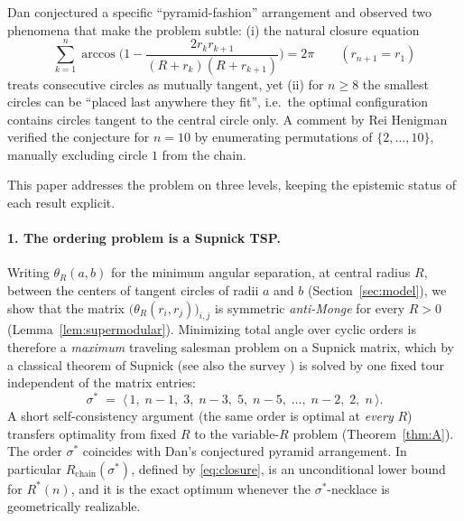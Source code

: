 \documentclass[11pt]{article}
\theoremstyle{definition}
\theoremstyle{remark}
\begin{document}
Dan conjectured a specific ``pyramid-fashion'' arrangement and observed two phenomena that make the problem subtle: (i) the natural closure equation
\begin{equation}\label{eq:closure}
\sum_{k=1}^{n}\arccos\!\Big(1-\frac{2r_kr_{k+1}}{(R+r_k)(R+r_{k+1})}\Big)=2\pi
\qquad (r_{n+1}=r_1)
\end{equation}
treats consecutive circles as mutually tangent, yet (ii) for $n\ge 8$ the smallest circles can be ``placed last anywhere they fit'', i.e.\ the optimal configuration contains circles tangent to the central circle only. A comment by Rei Henigman \cite{mse} verified the conjecture for $n=10$ by enumerating permutations of $\{2,\dots,10\}$, manually excluding circle $1$ from the chain.

This paper addresses the problem on three levels, keeping the epistemic status of each result explicit.

\paragraph{1. The ordering problem is a Supnick TSP.}
Writing $\theta_R(a,b)$ for the minimum angular separation, at central radius $R$, between the centers of tangent circles of radii $a$ and $b$ (Section~\ref{sec:model}), we show that the matrix $\big(\theta_R(r_i,r_j)\big)_{i,j}$ is symmetric \emph{anti-Monge} for every $R>0$ (Lemma~\ref{lem:supermodular}). Minimizing total angle over cyclic orders is therefore a \emph{maximum} traveling salesman problem on a Supnick matrix, which by a classical theorem of Supnick \cite{supnick} (see also the survey \cite{bdvvw}) is solved by one fixed tour independent of the matrix entries:
\[
\sigma^\ast \;=\; \langle\, 1,\; n-1,\; 3,\; n-3,\; 5,\; n-5,\;\dots,\; n-2,\; 2,\; n \,\rangle .
\]
A short self-consistency argument (the same order is optimal at \emph{every} $R$) transfers optimality from fixed $R$ to the variable-$R$ problem (Theorem~\ref{thm:A}). The order $\sigma^\ast$ coincides with Dan's conjectured pyramid arrangement. In particular $R_{\mathrm{chain}}(\sigma^\ast)$, defined by \eqref{eq:closure}, is an unconditional lower bound for $R^\ast(n)$, and it is the exact optimum whenever the $\sigma^\ast$-necklace is geometrically realizable.
\end{document}
